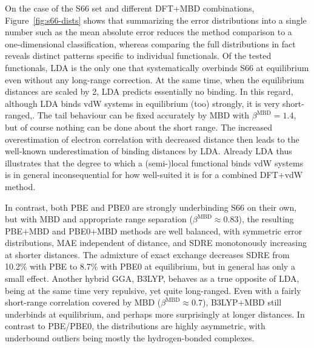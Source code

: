 On the case of the S66 set and different DFT+MBD combinations, Figure~\ref{fig:s66-dists} shows that summarizing the error distributions into a single number such as the mean absolute error reduces the method comparison to a one-dimensional classification, whereas comparing the full distributions in fact reveals distinct patterns specific to individual functionals.
Of the tested functionals, LDA is the only one that systematically overbinds S66 at equilibrium even without any long-range correction.
At the same time, when the equilibrium distances are scaled by 2, LDA predicts essentially no binding.
In this regard, although LDA binds vdW systems in equilibrium (too) strongly, it is very short-ranged,.
The tail behaviour can be fixed accurately by MBD with $\beta^\text{MBD}=1.4$, but of course nothing can be done about the short range.
The increased overestimation of electron correlation with decreased distance then leads to the well-known underestimation of binding distances by LDA\@.
Already LDA thus illustrates that the degree to which a (semi-)local functional binds vdW systems is in general inconsequential for how well-suited it is for a combined DFT+vdW method. %

In contrast, both PBE and PBE0 are strongly underbinding S66 on their own, but with MBD and appropriate range separation ($\beta^\text{MBD}\approx0.83$), the resulting PBE+MBD and PBE0+MBD methods are well balanced, with symmetric error distributions, MAE independent of distance, and SDRE monotonously increasing at shorter distances.
The admixture of exact exchange decreases SDRE from 10.2\% with PBE to 8.7\% with PBE0 at equilibrium, but in general has only a small effect.
Another hybrid GGA, B3LYP, behaves as a true opposite of LDA, being at the same time very repulsive, yet quite long-ranged.
Even with a fairly short-range correlation covered by MBD ($\beta^\text{MBD}\approx0.7$), B3LYP+MBD still underbinds at equilibrium, and perhaps more surprisingly at longer distances.
In contrast to PBE/PBE0, the distributions are highly asymmetric, with underbound outliers being mostly the hydrogen-bonded complexes.

